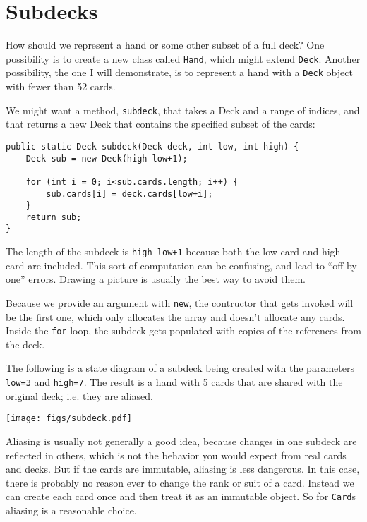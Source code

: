 \documentclass[12pt]{book}
\theoremstyle{definition}
\begin{document}
\section {Subdecks}

How should we represent a hand or some other subset of a full deck?
One possibility is to create a new class called {\tt Hand}, which
might extend {\tt Deck}.  Another possibility, the one I will
demonstrate, is to represent a hand with a {\tt Deck} object with
fewer than 52 cards.

We might want a method, {\tt subdeck}, that takes a Deck
and a range of indices, and that returns a new Deck that
contains the specified subset of the cards:

\begin{lstlisting}
public static Deck subdeck(Deck deck, int low, int high) {
    Deck sub = new Deck(high-low+1);
	
    for (int i = 0; i<sub.cards.length; i++) {
        sub.cards[i] = deck.cards[low+i];
    }
    return sub;
}
\end{lstlisting}

The length of the subdeck is {\tt high-low+1} because both the low
card and high card are included.  This sort of computation can be
confusing, and lead to ``off-by-one'' errors.  Drawing a picture is
usually the best way to avoid them.

Because we provide an argument with {\tt new}, the
contructor that gets invoked will be the first one, which only
allocates the array and doesn't allocate any cards.  Inside the
{\tt for} loop, the subdeck gets populated with copies of the
references from the deck.

The following is a state diagram of a subdeck being created with the
parameters {\tt low=3} and {\tt high=7}.  The result is a hand with 5
cards that are shared with the original deck; i.e. they are aliased.

\texttt{[image: figs/subdeck.pdf]}


Aliasing is usually not generally a good idea, because
changes in one subdeck are reflected in others, which is not the
behavior you would expect from real cards and decks.  But if the
cards are immutable, aliasing is less dangerous.
In this case, there is probably no reason ever to change the
rank or suit of a card.  Instead we can create each card
once and then treat it as an immutable object.  So for {\tt Card}s
aliasing is a reasonable choice.
\end{document}
